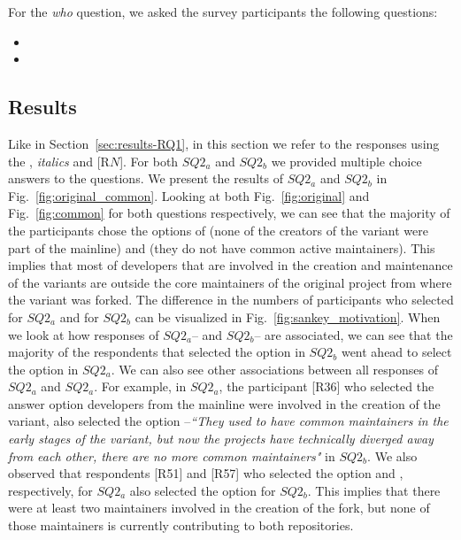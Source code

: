 For the \textit{who} question, we asked the survey participants the following questions:

\begin{itemize}
\item  \rqTwoOne
\item \rqTwoTwo
\end{itemize}

\subsection{Results}
Like in Section~\ref{sec:results-RQ1}, in this section we refer to the responses using the , \emph{italics} and [R$N$].
For both $SQ2_{a}$ and $SQ2_{b}$ we provided multiple choice answers to the questions. We present the results of $SQ2_{a}$ and $SQ2_{b}$ in Fig.~\ref{fig:original_common}. Looking at both Fig.~\ref{fig:original} and Fig.~\ref{fig:common} for both questions respectively, we can see that the majority of the participants chose the options of  (none of the creators of the variant were part of the mainline) and  (they do not have common active maintainers).
This implies that most of developers that are involved in the creation and maintenance of the variants are outside the core maintainers of the original project from where the variant was forked.
The difference in the numbers of participants who selected   for $SQ2_{a}$ and  for $SQ2_{b}$ can be visualized in Fig.~\ref{fig:sankey_motivation}.
When we look at how responses of $SQ2_{a}$-- and $SQ2_{b}$-- are associated, we can see that the majority of the respondents that selected the option  in $SQ2_{b}$ went ahead to select the option  in $SQ2_{a}$. We can also see other associations between all responses of $SQ2_{a}$ and $SQ2_{a}$.
For example, in $SQ2_{a}$, the participant [R36] who selected the answer option  developers from the mainline were involved in the creation of the variant, also selected the option  --\emph{``They used to have common maintainers in the early stages of the variant, but now the projects have technically diverged away from each other, there are no more common maintainers"} in $SQ2_{b}$.
We also observed that respondents [R51] and [R57] who selected the option  and , respectively, for $SQ2_{a}$ also selected the option  for $SQ2_{b}$. This implies that there were at least two maintainers involved in the creation of the fork, but none of those maintainers is currently contributing to both repositories.



